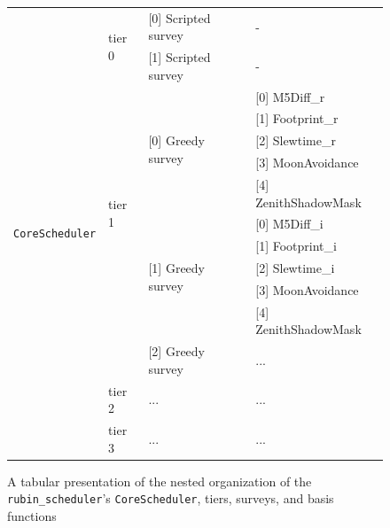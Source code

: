 \documentclass[OPS,lsstdraft,authoryear,toc]{lsstdoc}
\begin{document}
\begin{figure}
    \centering
    \begin{tabular}{|l|l|l|l|} \hline
         \multirow{15}{*}{\texttt{CoreScheduler}} &  \multirow{2}{*}{tier 0} & [0] Scripted survey & - \\ \cline{3-4}
          &                          & [1] Scripted survey                & - \\  \cline{2-4}
          & \multirow{10}{*}{tier 1} & \multirow{5}{*}{[0] Greedy survey} & [0] M5Diff\_r \\ \cline{4-4}
          &                          &                                    & [1] Footprint\_r \\  \cline{4-4}
          &                          &                                    & [2] Slewtime\_r \\  \cline{4-4}
          &                          &                                    & [3] MoonAvoidance \\ \cline{4-4}
          &                          &                                    & [4] ZenithShadowMask \\ \cline{3-4}
          &                          & \multirow{5}{*}{[1] Greedy survey} & [0] M5Diff\_i \\  \cline{4-4}
          &                          &                                    & [1] Footprint\_i \\  \cline{4-4}
          &                          &                                    & [2] Slewtime\_i \\ \cline{4-4}
          &                          &                                    & [3] MoonAvoidance \\ \cline{4-4}
          &                          &                                    & [4] ZenithShadowMask \\ \cline{3-4}
          &                          & [2] Greedy survey                  & ... \\ \cline{2-4}
          & tier 2                   & ...                                & ... \\ \cline{2-4}
          & tier 3                   & ...                                & ... \\ \hline
    \end{tabular}
    \caption{A tabular presentation of the nested organization of the \texttt{rubin\_scheduler}'s \texttt{CoreScheduler}, tiers, surveys, and basis functions}
    \label{tab:schedinsttab}
\end{figure}
\end{document}
